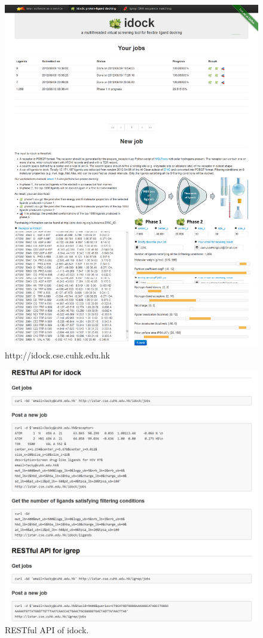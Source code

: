 \begin{figure}
\centering
\includegraphics[width=\linewidth]{istar/idock.png}
\caption{http://idock.cse.cuhk.edu.hk}
\label{istar:idock}
\end{figure}

\begin{figure}
\centering
\includegraphics[width=\linewidth]{istar/RESTfulAPI.png}
\caption{RESTful API of idock.}
\label{istar:idock-rest}
\end{figure}

